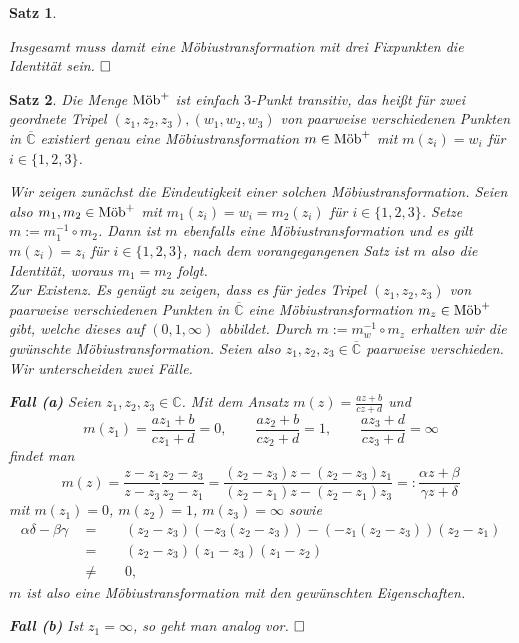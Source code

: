 \documentclass[11pt]{book}
\numberwithin{dummy}{section}
\newtheorem{theorem}{Satz}[section]
\theoremstyle{nonumberbreak}
\newenvironment{pr}[1][]{\ifthenelse{\equal{#1}{}}{\proof}{\proof[#1]}\rm}{\endproof}
\newcommand{\C}{\mathbb{C}}
\newcommand{\CC}{\overline{\mathbb{C}}}
\newcommand{\mob}{\textup{Möb}^+}
\begin{document}
\begin{spacing}{1.4}
\begin{theorem}
\begin{pr}
\begin{compactenum}
\end{compactenum}
Insgesamt muss damit eine Möbiustransformation mit drei Fixpunkten die Identität sein. $\hfill \Box$
\end{pr}
\end{theorem}


\hypertarget{satzeinsdreidrei}{}
\begin{theorem}    %
Die Menge $\mob$ ist \textit{einfach $3$-Punkt transitiv}, das heißt für zwei geordnete Tripel $(z_1, z_2, z_3), (w_1, w_2, w_3)$ von paarweise verschiedenen Punkten in $\CC$ existiert genau eine Möbiustransformation $m\in \mob$ mit $m(z_i) = w_i$ für $i \in \{1,2,3\}$. 


\begin{pr}
Wir zeigen zunächst die Eindeutigkeit einer solchen Möbiustransformation. Seien also $m_1, m_2 \in \mob$ mit $m_1(z_i) = w_i = m_2(z_i)$ für $i \in \{1,2,3\}$. Setze $m:= m_1^{-1} \circ m_2$. Dann ist $m$ ebenfalls eine Möbiustransformation und es gilt $m(z_i) = z_i$ für $i \in \{1,2,3\}$, nach dem vorangegangenen Satz ist $m$ also die Identität, woraus $m_1 = m_2$ folgt.\\
Zur Existenz. Es genügt zu zeigen, dass es für jedes Tripel $(z_1, z_2, z_3)$ von paarweise verschiedenen Punkten in $\CC$ eine Möbiustransformation $m_z \in \mob$ gibt, welche dieses auf $(0,1,\infty)$ abbildet. Durch $m:= m_w^{-1} \circ m_z$ erhalten wir die gwünschte Möbiustransformation. Seien also $z_1, z_2, z_3 \in \CC$ paarweise verschieden. Wir unterscheiden zwei Fälle.
\begin{compactenum}
\item[\textbf{Fall (a)}] Seien $z_1, z_2, z_3 \in \C$. Mit dem Ansatz $m(z) = \frac{az+b}{cz+d}$ und 
$$m(z_1) = \frac{az_1 +b}{cz_1 + d} = 0, \qquad \frac{az_2+b}{cz_2+d}=1, \qquad \frac{az_3+d}{cz_3+d}= \infty$$ findet man
$$m(z) = \frac{z-z_1}{z-z_3} \frac{z_2-z_3}{z_2-z_1} = \frac{(z_2-z_3)z - (z_2-z_3)z_1}{(z_2-z_1)z - (z_2-z_1)z_3} =: \frac{\alpha z + \beta}{\gamma z + \delta}$$
mit $m(z_1)=0$, $m(z_2)=1$, $m(z_3)=\infty$ sowie
\begin{alignat*}
\alpha \delta - \beta \gamma \ \ &=&& \ \  (z_2-z_3)(-z_3(z_2-z_3)) - (-z_1(z_2-z_3))(z_2-z_1)\\
& =&& \ \  (z_2-z_3)(z_1-z_3)(z_1-z_2)\\
& \neq&& \ \  0,
\end{alignat*}
$m$ ist also eine Möbiustransformation mit den gewünschten Eigenschaften.
\item[\textbf{Fall (b)}] Ist $z_1 = \infty$, so geht man analog vor. $\hfill \Box$



\end{compactenum}
\end{pr}
\end{theorem}
\end{spacing}
\end{document}
